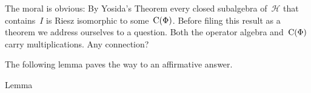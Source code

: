 \documentclass[main.tex]{subfiles}
\begin{document}
\noindent The moral is obvious:
By Yosida's Theorem every closed subalgebra of~$\mathscr H$
that contains~$I$
is Riesz isomorphic to some~$\mathrm{C}(\Phi)$.
Before filing this result as a theorem
we address ourselves to a question.
Both the operator algebra and~$\mathrm{C}(\Phi)$
carry multiplications.
Any connection?

The following lemma paves the way to an affirmative answer.
%
%
\begin{psec}{5.26}{Lemma}\end{psec}
\end{document}
